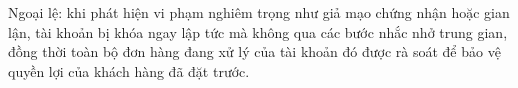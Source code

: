 Ngoại lệ: khi phát hiện vi phạm nghiêm trọng như giả mạo chứng nhận hoặc gian lận, tài khoản bị khóa ngay lập tức mà không qua các bước nhắc nhở trung gian, đồng thời toàn bộ đơn hàng đang xử lý của tài khoản đó được rà soát để bảo vệ quyền lợi của khách hàng đã đặt trước.

